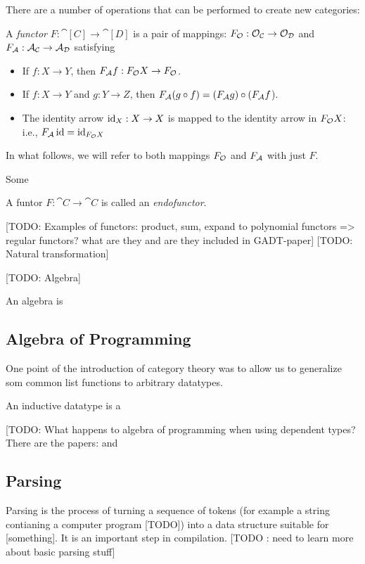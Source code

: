 \documentclass{article}
\begin{document}
There are a number of operations that can be performed to create new categories:


\begin{Def}
A \emph{functor} $F : \cat[C] \to \cat[D]$ is a pair of mappings:  $F_{\obj} : \obj_{\cat[C]} \to \obj_{\cat[D]}$ and $F_{\arr} : \arr_{\cat[C]} \to \arr_{\cat[D]}$ satisfying
\begin{itemize}
\item If $f : X \to Y$, then $F_{\arr} f : F_{\obj} X \to F_{\obj}$.
\item If $f : X \to Y$ and $g : Y \to Z$, then $F_{\arr} (g \comp f) = (F_{\arr} g) \comp (F_{\arr} f$).
\item The identity arrow $\id_X : X \to X$ is mapped to the identity arrow in $F_{\obj} X$: i.e., $F_{\arr} \id = \id_{F_{\obj}X}$
\end{itemize}
\end{Def}
In what follows, we will refer to both mappings $F_{\obj}$ and $F_{\arr}$ with just $F$.

Some 
\begin{Def}
  A funtor $F : \cat{C} \to \cat{C}$ is called an \emph{endofunctor}.
\end{Def}
[TODO: Examples of functors: product, sum, expand to polynomial functors => regular functors? what are they and are they included in GADT-paper]
[TODO: Natural transformation]


[TODO: Algebra]
\begin{Def}
  An algebra is 
\end{Def}
\subsection{Algebra of Programming}
One point of the introduction of category theory was to allow us to generalize som common list functions to arbitrary datatypes.

An inductive datatype is a 

[TODO: What happens to algebra of programming when using dependent types? There are the papers: \cite{gambino_hyland_2004} and \cite{gadt_semantics_2011}  
\subsection{Parsing}
Parsing is the process of turning a sequence of tokens (for example a string contianing a computer program [TODO]) into a data structure suitable for [something]. It is an important step in compilation. [TODO : need to learn more about basic parsing stuff]
\end{document}
